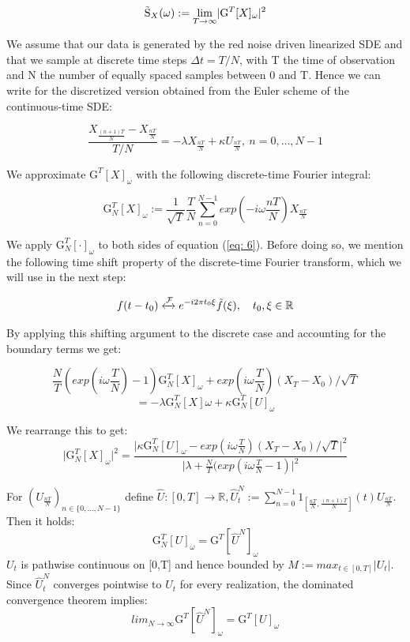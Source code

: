 \documentclass[%
thesis=student,%
coverpage=false,%
titlepage=false,%
headmarks=true, %
english,%
font=libertine, %
math=newpxtx, %
BCOR=5mm,%
coverBCOR=11mm%
]{tumbook}
\begin{document}
\[
    \mathrm{\Tilde{S}}_{X}(\omega) := \lim_{T\rightarrow\infty} \lvert \mathrm{G}^{T}[X]_{\omega}\rvert ^2
\]


We assume that our data is generated by the red noise driven linearized SDE and that we sample at discrete time steps $\Delta t = T/N$, with T the time of observation and N the number of equally spaced samples between 0 and T. Hence we can write for the discretized version obtained from the Euler scheme of the continuous-time SDE:

        \begin{equation}  
        \frac{X_{\frac{(n+1)T}{N}}-X_{\frac{nT}{N}}}{T/N} = -\lambda X_{\frac{nT}{N}} + \kappa U_{\frac{nT}{N}}, \ n = 0, \dots, N-1 \label{eq: 6}
        \end{equation}


We approximate $\mathrm{G}^{T}[X]_{\omega}$ with the following discrete-time Fourier integral:

    \[
    \mathrm{G}_{N}^{T}[X]_{\omega}:= \frac{1}{\sqrt{T}}\frac{T}{N}\sum_{n=0}^{N-1}exp(-i\omega\frac{nT}{N})X_{\frac{nT}{N}}
    \]


We apply $\mathrm{G}_{N}^{T}[\cdot]_{\omega}$ to both sides of equation (\ref{eq: 6}). Before doing so, we mention the following time shift property of the discrete-time Fourier transform, which we will use in the next step:

\[
f(t-t_{0}) \xleftrightarrow{\mathcal{F}} e^{-i2\pi t_{0}\xi}\Tilde{f}(\xi), \ \ \ t_{0},\xi \in \mathbb{R}
\]

By applying this shifting argument to the discrete case and accounting for the boundary terms we get: 
        
    \[
    \frac{N}{T}(exp(i\omega\frac{T}{N})-1)\mathrm{G}_{N}^{T}[X]_{\omega} + exp(i\omega\frac{T}{N})(X_{T}-X_{0})/\sqrt{T} 
    \]
    \[
    = -\lambda \mathrm{G}_{N}^{T}[X]\omega + \kappa \mathrm{G}_{N}^{T}[U]_{\omega}
    \]


We rearrange this to get:
    \[
    \lvert \mathrm{G}_{N}^{T}[X]_{\omega}\rvert ^2 = \frac{\lvert \kappa \mathrm{G}_{N}^{T}[U]_{\omega} - exp(i\omega\frac{T}{N})(X_{T}-X_{0})/\sqrt{T}\rvert ^2}{\lvert \lambda + \frac{N}{T}(exp(i\omega\frac{T}{N} - 1)\rvert^2}
    \]

For $(U_{\frac{nT}{N}})_{n \in \{0,...,N-1\}}$ define $\hat{U}:[0,T]\rightarrow\mathbb{R}, \hat{U}_{t}^{N} := \sum_{n=0}^{N-1}1_{[\frac{nT}{N},\frac{(n+1)T}{N}]}(t)U_{\frac{nT}{N}}$. Then it holds:
\[
\mathrm{G}_{N}^{T}[U]_{\omega} = \mathrm{G}^{T}[\hat{U}^{N}]_{\omega}
\]
$U_{t}$ is pathwise continuous on [0,T] and hence bounded by $M := max_{t\in [0,T]} \lvert U_{t} \rvert$. Since $\hat{U}_{t}^{N}$ converges pointwise to $U_{t}$ for every realization, the dominated convergence theorem implies:
\[
lim_{N\rightarrow\infty}\mathrm{G}^{T}[\hat{U}^{N}]_{\omega} = \mathrm{G}^{T}[U]_{\omega}
\]
\end{document}
